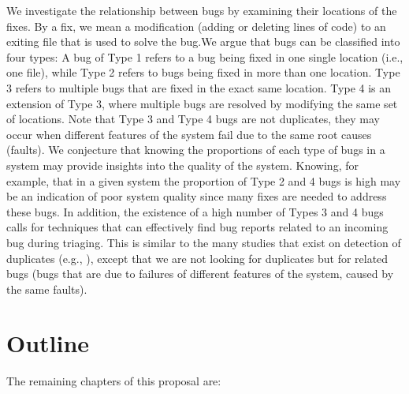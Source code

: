 We investigate the relationship between bugs by examining their locations of the fixes.
By a fix, we mean a modification (adding or deleting lines of code) to an exiting file that is used to solve the bug.We argue that bugs can be classified into four types:
A bug of Type 1 refers to a bug being fixed in one single location (i.e., one file), while Type 2 refers to bugs being fixed in more than one location.
Type 3 refers to multiple bugs that are fixed in the exact same location.
Type 4 is an extension of Type 3, where multiple bugs are resolved by modifying the same set of locations.
Note that Type 3 and Type 4 bugs are not duplicates, they may occur when different features of the system fail due to the same root causes (faults).
We conjecture that knowing the proportions of each type of bugs in a system may provide insights into the quality of the system.
Knowing, for example, that in a given system the proportion of Type 2 and 4 bugs is high may be an indication of poor system quality since many fixes are needed to address these bugs.
In addition, the existence of a high number of Types 3 and 4 bugs calls for techniques that can effectively find bug reports related to an incoming bug during triaging.
This is similar to the many studies that exist on detection of duplicates (e.g., \cite{Runeson2007, Sun2010,Nguyen2012}), except that we are not looking for duplicates but for related bugs (bugs that are due to failures of different features of the system, caused by the same faults).

\section{Outline\label{sec:outline}}

The remaining chapters of this proposal are:


